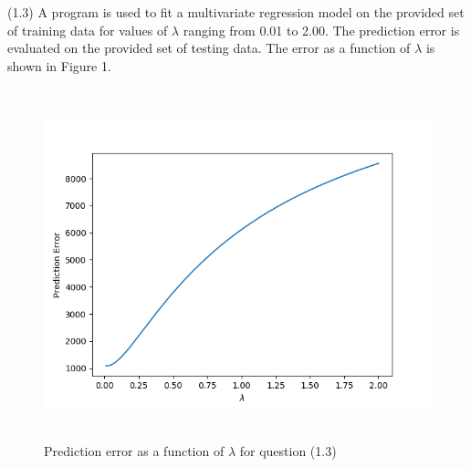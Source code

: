 (1.3) A program is used to fit a multivariate regression model on the provided set of training data for values of $\lambda$ ranging from 0.01 to 2.00. The prediction error is evaluated on the provided set of testing data. The error as a function of $\lambda$ is shown in Figure 1.
\begin{figure}[h!]
    \centering
    \includegraphics[height=4in]{Figure_1.png}
    \caption{Prediction error as a function of $\lambda$ for question (1.3)}
\end{figure}
\vspace{3cm}

